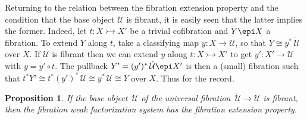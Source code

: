 \documentclass[12pt]{article}
\newcommand{\ra}{\ensuremath{\rightarrow}}
\newcommand{\cof}{\ensuremath{\rightarrowtail}}
\newcommand{\fib}{\ensuremath{\epi}}
\newcommand{\II}{\ensuremath{\mathbb{I}}}
\newcommand{\U}{\ensuremath{\mathcal{U}}}
\newcommand{\UU}{\ensuremath{\,\dot{\mathcal{U}}}}
\newtheorem{proposition}[theorem]{Proposition}
\newtheorem{lemma}[theorem]{Lemma}
\theoremstyle{remark}
\theoremstyle{definition}
\begin{document}
%
%
%
%
%

Returning to the relation between the fibration extension property and the condition that the base object $\U$ is fibrant, it is easily seen that the latter implies the former.  Indeed, let $t : X\cof X'$ be a trivial cofibration and $Y \fib X$ a fibration.  To extend $Y$ along $t$, take a classifying map $y : X \ra \U$, so that $Y \cong y^*\UU$ over $X$. If $\U$ is fibrant then we can extend $y$ along $t : X\cof X'$ to get $y' : X' \ra \U$ with $y = y'\circ t$.  The pullback $Y' = (y')^*\UU \fib X'$ is then a (small) fibration such that $t^*Y' \cong t^*(y')^*\UU\cong y^*\UU \cong Y$ over $X$.  Thus for the record.

\begin{proposition}\label{prop:UfibtoFEP}
If the base object $\,\U$ of the universal fibration $\UU\ra\U$ is fibrant, then the fibration weak factorization system has the fibration extension property.
\end{proposition}
\end{document}
